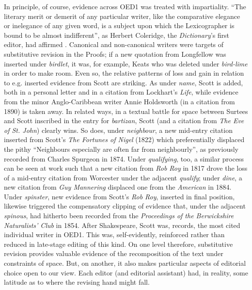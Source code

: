 \documentclass[output=paper,colorlinks,citecolor=brown,arabicfont,chinesefont]{langscibook}
\begin{document}
In principle, of course, evidence across OED1 was treated with impartiality. “The literary merit or demerit of any particular writer, like the comparative elegance or inelegance of any given word, is a subject upon which the Lexicographer is bound to be almost indifferent”, as Herbert Coleridge, the \emph{Dictionary}’s first editor, had affirmed \parencite[2]{Coleridge1858}. Canonical and non-canonical writers were targets of substitutive revision in the Proofs; if a new quotation from Longfellow was inserted under \emph{birdlet}, it was, for example, Keats who was deleted under \emph{bird-lime} in order to make room. Even so, the relative patterns of loss and gain in relation to e.g. inserted evidence from Scott are striking. As under \emph{name}, Scott is added, both in a personal letter and in a citation from Lockhart’s \emph{Life}, while evidence from the minor Anglo-Caribbean writer Annie Holdsworth (in a citation from 1890) is taken away. In related ways, in a textual battle for space between Surtees and Scott inscribed in the entry for \emph{bartizan}, Scott (and a citation from \emph{The Eve of St. John}) clearly wins. So does, under \emph{neighbour}, a new mid-entry citation inserted from Scott’s \emph{The Fortunes of Nigel} (1822) which preferentially displaced the pithy “Neighbours especially are often far from neighbourly”, as previously recorded from Charles Spurgeon in 1874. Under \emph{qualifying}, too, a similar process can be seen at work such that a new citation from \emph{Rob Roy} in 1817 drove the loss of a mid-entry citation from Worcester under the adjacent \emph{qualify}; under \emph{dine}, a new citation from \emph{Guy Mannering} displaced one from the \emph{American} in 1884. Under \emph{spinster}, new evidence from Scott’s \emph{Rob Roy}, inserted in final position, likewise triggered the compensatory clipping of evidence that, under the adjacent \emph{spinous}, had hitherto been recorded from the \emph{Proceedings of the Berwickshire Naturalists’ Club} in 1854. After Shakespeare, Scott was, \citet{Brewernodate} records, the most cited individual writer in OED1. This was, self-evidently, reinforced rather than reduced in late-stage editing of this kind. On one level therefore, substitutive revision provides valuable evidence of the recomposition of the text under constraints of space. But, on another, it also makes particular aspects of editorial choice open to our view. Each editor (and editorial assistant) had, in reality, some latitude as to where the revising hand might fall. 
\end{document}
